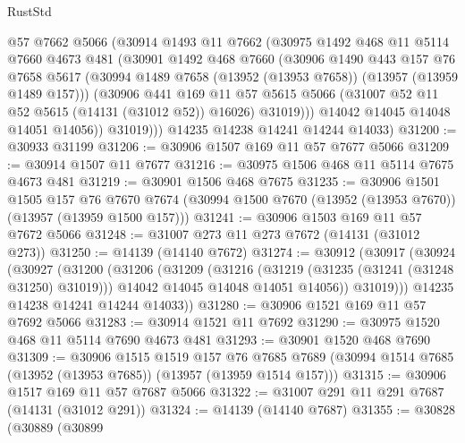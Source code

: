 \begin{lexlean}{RustStd}
\begin{coremodule}
            @57
            @7662
            @5066
            (@30914
              @1493
              @11
              @7662
              (@30975
                @1492
                @468
                @11
                @5114
                @7660
                @4673
                @481
                (@30901
                  @1492
                  @468
                  @7660
                  (@30906
                    @1490
                    @443
                    @157
                    @76
                    @7658
                    @5617
                    (@30994 @1489 @7658 (@13952 (@13953 @7658)) (@13957 (@13959 @1489 @157)))
                    (@30906
                      @441
                      @169
                      @11
                      @57
                      @5615
                      @5066
                      (@31007 @52 @11 @52 @5615 (@14131 (@31012 @52)) @16026)
                      @31019)))
                @14042
                @14045
                @14048
                @14051
                @14056))
            @31019)))
      @14235
      @14238
      @14241
      @14244
      @14033)
@31200 := @30933 @31199
@31206 := @30906 @1507 @169 @11 @57 @7677 @5066
@31209 := @30914 @1507 @11 @7677
@31216 := @30975 @1506 @468 @11 @5114 @7675 @4673 @481
@31219 := @30901 @1506 @468 @7675
@31235 := @30906
    @1501
    @1505
    @157
    @76
    @7670
    @7674
    (@30994 @1500 @7670 (@13952 (@13953 @7670)) (@13957 (@13959 @1500 @157)))
@31241 := @30906 @1503 @169 @11 @57 @7672 @5066
@31248 := @31007 @273 @11 @273 @7672 (@14131 (@31012 @273))
@31250 := @14139 (@14140 @7672)
@31274 := @30912
    (@30917
      (@30924
        (@30927
          (@31200
            (@31206
              (@31209
                (@31216
                  (@31219 (@31235 (@31241 (@31248 @31250) @31019)))
                  @14042
                  @14045
                  @14048
                  @14051
                  @14056))
              @31019)))
        @14235
        @14238
        @14241
        @14244
        @14033))
@31280 := @30906 @1521 @169 @11 @57 @7692 @5066
@31283 := @30914 @1521 @11 @7692
@31290 := @30975 @1520 @468 @11 @5114 @7690 @4673 @481
@31293 := @30901 @1520 @468 @7690
@31309 := @30906
    @1515
    @1519
    @157
    @76
    @7685
    @7689
    (@30994 @1514 @7685 (@13952 (@13953 @7685)) (@13957 (@13959 @1514 @157)))
@31315 := @30906 @1517 @169 @11 @57 @7687 @5066
@31322 := @31007 @291 @11 @291 @7687 (@14131 (@31012 @291))
@31324 := @14139 (@14140 @7687)
@31355 := @30828
    (@30889
      (@30899

\end{coremodule}
\end{lexlean}
